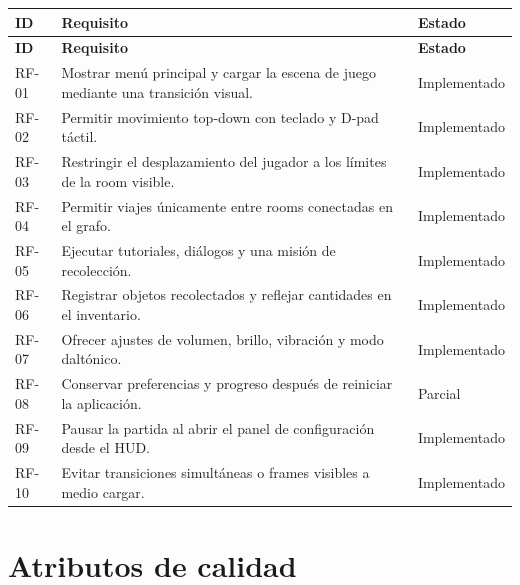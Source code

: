 \documentclass[11pt,a4paper,oneside]{report}
\begin{document}
\begin{longtable}{L{0.12\textwidth} L{0.55\textwidth} L{0.18\textwidth}}
  \toprule
  \color{white}\textbf{ID} & \color{white}\textbf{Requisito} & \color{white}\textbf{Estado} \\
  \midrule
  \endfirsthead
  \toprule
  \color{white}\textbf{ID} & \color{white}\textbf{Requisito} & \color{white}\textbf{Estado} \\
  \midrule
  \endhead
  RF-01 & Mostrar menú principal y cargar la escena de juego mediante una transición visual. & Implementado \\
  RF-02 & Permitir movimiento top-down con teclado y D-pad táctil. & Implementado \\
  RF-03 & Restringir el desplazamiento del jugador a los límites de la room visible. & Implementado \\
  RF-04 & Permitir viajes únicamente entre rooms conectadas en el grafo. & Implementado \\
  RF-05 & Ejecutar tutoriales, diálogos y una misión de recolección. & Implementado \\
  RF-06 & Registrar objetos recolectados y reflejar cantidades en el inventario. & Implementado \\
  RF-07 & Ofrecer ajustes de volumen, brillo, vibración y modo daltónico. & Implementado \\
  RF-08 & Conservar preferencias y progreso después de reiniciar la aplicación. & Parcial \\
  RF-09 & Pausar la partida al abrir el panel de configuración desde el HUD. & Implementado \\
  RF-10 & Evitar transiciones simultáneas o frames visibles a medio cargar. & Implementado \\
  \bottomrule
\end{longtable}

\section{Atributos de calidad}
\end{document}
